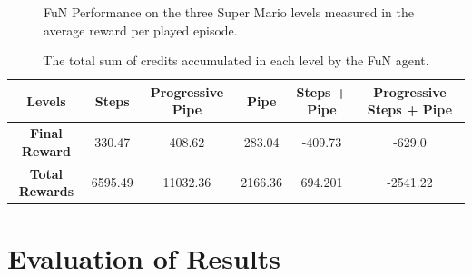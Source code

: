 \documentclass[notitlepage,a4paper,11pt]{article}
\begin{document}
\begin{figure}[t]
\begin{subfigure}[t]{0.32\textwidth}
         \caption{}
         \label{fig:fun_results_3}
     \end{subfigure}
        \caption{FuN Performance on the three Super Mario levels measured in the average reward per played episode.}
        \label{fig:fun_results}
        
\end{figure}

\begin{table}[h!]
\centering
\begin{tabular}{ |c|c|c|c|c|c| } 
	\hline
	\textbf{Levels} & Steps & Progressive Pipe  & Pipe & Steps + Pipe & Progressive Steps + Pipe \\
	\hline
	\textbf{Final Reward} & 330.47 & 408.62 & 283.04 & -409.73 & -629.0 \\
	\hline
	\textbf{Total Rewards} & 6595.49 & 11032.36 & 2166.36 & 694.201 & -2541.22 \\
	\hline
\end{tabular}
\caption{The total sum of credits accumulated in each level by the FuN agent.}

\end{table}

\section{Evaluation of Results}
\end{document}
